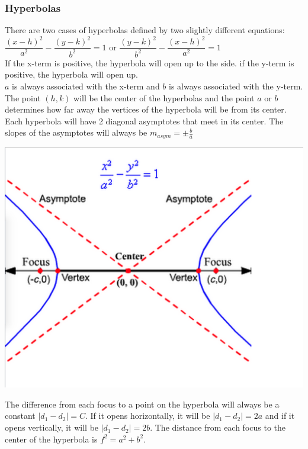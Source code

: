 \subsubsection{Hyperbolas}
There are two cases of hyperbolas defined by two slightly different equations: $\dfrac{(x-h)^2}{a^2}-\dfrac{(y-k)^2}{b^2}=1$ or $\dfrac{(y-k)^2}{b^2}-\dfrac{(x-h)^2}{a^2}=1$\\
If the x-term is positive, the hyperbola will open up to the side. if the y-term is positive, the hyperbola will open up.\\
$a$ is always associated with the x-term and $b$ is always associated with the y-term.\\
The point $(h,k)$ will be the center of the hyperbolas and the point $a$ or $b$ determines how far away the vertices of the hyperbola will be from its center. Each hyperbola will have 2 diagonal asymptotes that meet in its center. The slopes of the asymptotes will always be $m_{asym}=\pm\frac{b}{a}$\\
\centerline{\includegraphics[scale=0.3]{Images/PreCalcPictures/HyperbolaGraph.png}}
The difference from each focus to a point on the hyperbola will always be a constant $|d_1-d_2|=C$. If it opens horizontally, it will be $|d_1-d_2|=2a$ and if it opens vertically, it will be $|d_1-d_2|=2b$. The distance from each focus to the center of the hyperbola is $f^2=a^2+b^2$.